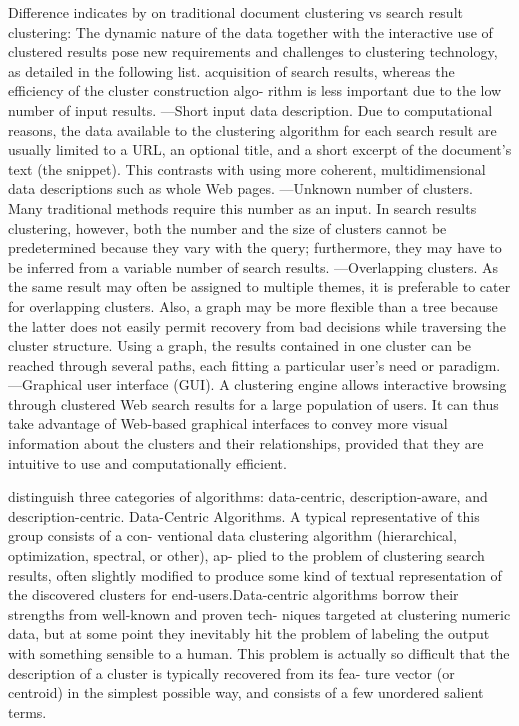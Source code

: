 \documentclass[runningheads]{llncs}
\begin{document}
Difference indicates by \cite{Carpineto} on traditional document clustering vs search result clustering:
The dynamic nature of the data together with the interactive use of clustered results pose new requirements and challenges to clustering technology, as detailed in the following list.
acquisition of search results, whereas the efficiency of the cluster construction algo- rithm is less important due to the low number of input results.
—Short input data description. Due to computational reasons, the data available to the clustering algorithm for each search result are usually limited to a URL, an optional title, and a short excerpt of the document’s text (the snippet). This contrasts with using more coherent, multidimensional data descriptions such as whole Web pages.
—Unknown number of clusters. Many traditional methods require this number as an input. In search results clustering, however, both the number and the size of clusters cannot be predetermined because they vary with the query; furthermore, they may have to be inferred from a variable number of search results.
—Overlapping clusters. As the same result may often be assigned to multiple themes, it is preferable to cater for overlapping clusters. Also, a graph may be more flexible than a tree because the latter does not easily permit recovery from bad decisions while traversing the cluster structure. Using a graph, the results contained in one cluster can be reached through several paths, each fitting a particular user’s need or paradigm.
—Graphical user interface (GUI). A clustering engine allows interactive browsing through clustered Web search results for a large population of users. It can thus take advantage of Web-based graphical interfaces to convey more visual information about the clusters and their relationships, provided that they are intuitive to use and computationally efficient.

\cite{Carpineto} distinguish three categories of algorithms: data-centric, description-aware, and description-centric.
Data-Centric Algorithms. A typical representative of this group consists of a con- ventional data clustering algorithm (hierarchical, optimization, spectral, or other), ap- plied to the problem of clustering search results, often slightly modified to produce some kind of textual representation of the discovered clusters for end-users.Data-centric algorithms borrow their strengths from well-known and proven tech- niques targeted at clustering numeric data, but at some point they inevitably hit the problem of labeling the output with something sensible to a human. This problem is actually so difficult that the description of a cluster is typically recovered from its fea- ture vector (or centroid) in the simplest possible way, and consists of a few unordered salient terms. 
\end{document}
